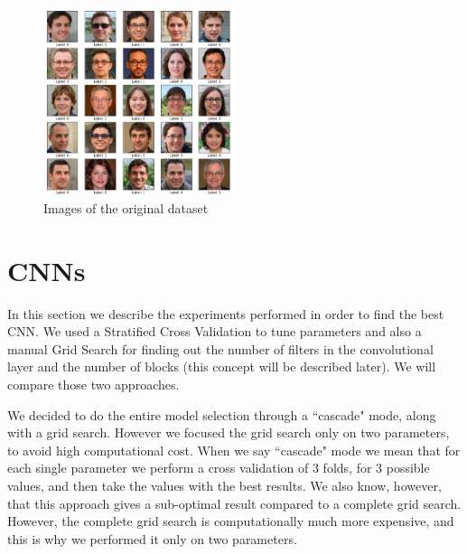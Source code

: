 \documentclass{article}
\begin{document}
\begin{figure}[h]
    \centering
    \includegraphics[width=0.5\textwidth]{images/images.png}
    \caption{Images of the original dataset}
    \label{fig:train_images}
\end{figure}

\section{CNNs}
\label{sec:cnn}
In this section we describe the experiments performed in order to find the best CNN. We used a  Stratified Cross Validation to tune parameters and also a manual Grid Search for finding out the number of filters in the convolutional layer and the number of blocks (this concept will be described later). We will compare those two approaches.

We decided to do the entire model selection through a ``cascade" mode, along with a grid search. However we focused the grid search only on two parameters, to avoid high computational cost. When we say ``cascade" mode we mean that for each single parameter we perform a cross validation of 3 folds, for 3 possible values, and then take the values with the best results. We also know, however, that this approach gives a sub-optimal result compared to a complete grid search. However, the complete grid search is computationally much more expensive, and this is why we performed it only on two parameters.
\end{document}
